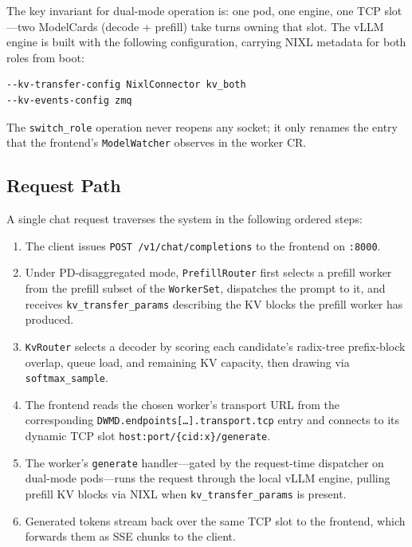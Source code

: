 \documentclass[10pt,twocolumn,letterpaper]{article}
\begin{document}
The key invariant for dual-mode operation is: one pod, one engine, one TCP slot---two ModelCards (decode + prefill) take turns owning that slot. The vLLM engine is built with the following configuration, carrying NIXL metadata for both roles from boot:

\begin{lstlisting}
--kv-transfer-config NixlConnector kv_both
--kv-events-config zmq
\end{lstlisting}

The \texttt{switch\_role} operation never reopens any socket; it only renames the entry that the frontend's \texttt{ModelWatcher} observes in the worker CR.

\subsection{Request Path}
\label{sec:request-path}

A single chat request traverses the system in the following ordered steps:

\begin{enumerate}[nosep]
\item The client issues \texttt{POST /v1/chat/completions} to the frontend on \texttt{:8000}.
\item Under PD-disaggregated mode, \texttt{PrefillRouter} first selects a prefill worker from the prefill subset of the \texttt{WorkerSet}, dispatches the prompt to it, and receives \texttt{kv\_transfer\_params} describing the KV blocks the prefill worker has produced.
\item \texttt{KvRouter} selects a decoder by scoring each candidate's radix-tree prefix-block overlap, queue load, and remaining KV capacity, then drawing via \texttt{softmax\_sample}.
\item The frontend reads the chosen worker's transport URL from the corresponding \texttt{DWMD.endpoints[\dots].transport.tcp} entry and connects to its dynamic TCP slot \texttt{host:port/\{cid:x\}/generate}.
\item The worker's \texttt{generate} handler---gated by the request-time dispatcher on dual-mode pods---runs the request through the local vLLM engine, pulling prefill KV blocks via NIXL when \texttt{kv\_transfer\_params} is present.
\item Generated tokens stream back over the same TCP slot to the frontend, which forwards them as SSE chunks to the client.
\end{enumerate}
\end{document}
